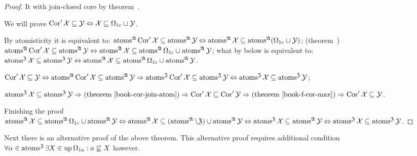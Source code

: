 \begin{proof}
It with join-closed core by theorem~.

We will prove $\operatorname{Cor}'\mathcal{X} \sqsubseteq \mathcal{Y} \Leftrightarrow
\mathcal{X} \sqsubseteq \Omega_{1c} \sqcup \mathcal{Y}$.

By atomisticity it is equivalent to:
$\operatorname{atoms}^{\mathfrak{A}}\operatorname{Cor}'\mathcal{X} \subseteq \operatorname{atoms}^{\mathfrak{A}}\mathcal{Y}
\Leftrightarrow
\operatorname{atoms}^{\mathfrak{A}}\mathcal{X} \subseteq \operatorname{atoms}^{\mathfrak{A}}(\Omega_{1c} \sqcup \mathcal{Y})$;
(theorem~)
$\operatorname{atoms}^{\mathfrak{A}}\operatorname{Cor}'\mathcal{X} \subseteq \operatorname{atoms}^{\mathfrak{A}}\mathcal{Y}
\Leftrightarrow
\operatorname{atoms}^{\mathfrak{A}}\mathcal{X} \subseteq \operatorname{atoms}^{\mathfrak{A}}\Omega_{1c} \cup \operatorname{atoms}^{\mathfrak{A}}\mathcal{Y}$;
what by below is equivalent to:
$\operatorname{atoms}^{\mathfrak{Z}}  \mathcal{X} \subseteq
\operatorname{atoms}^{\mathfrak{Z}}  \mathcal{Y} \Leftrightarrow
\operatorname{atoms}^{\mathfrak{A}}  \mathcal{X} \subseteq \operatorname{atoms}^{\mathfrak{A}}
\Omega_{1c} \cup \operatorname{atoms}^{\mathfrak{A}}  \mathcal{Y}$.

$\operatorname{Cor}' \mathcal{X} \sqsubseteq \mathcal{Y} \Leftrightarrow
\operatorname{atoms}^{\mathfrak{A}} \operatorname{Cor}' \mathcal{X} \subseteq
\operatorname{atoms}^{\mathfrak{A}}  \mathcal{Y} \Rightarrow
\operatorname{atoms}^{\mathfrak{Z}} \operatorname{Cor}' \mathcal{X} \subseteq
\operatorname{atoms}^{\mathfrak{Z}}  \mathcal{Y} \Leftrightarrow
\operatorname{atoms}^{\mathfrak{Z}}  \mathcal{X} \subseteq \operatorname{atoms}^{\mathfrak{Z}}
\mathcal{Y}$;

$\atoms^{\mathfrak{Z}}  \mathcal{X} \subseteq
\atoms^{\mathfrak{Z}}  \mathcal{Y} \Rightarrow
\text{(theorem~\bookref{cor-join-atom})} \Rightarrow
\Cor' \mathcal{X}
\sqsubseteq \Cor' \mathcal{Y} \Rightarrow
\text{(theorem~\bookref{f-cor-max})} \Rightarrow
\Cor' \mathcal{X} \sqsubseteq \mathcal{Y}$.

Finishing the proof
$\operatorname{atoms}^{\mathfrak{A}} \mathcal{X} \subseteq \operatorname{atoms}^{\mathfrak{A}}
\Omega_{1c} \cup \operatorname{atoms}^{\mathfrak{A}} \mathcal{Y} \Leftrightarrow
\operatorname{atoms}^{\mathfrak{A}} \mathcal{X} \subseteq
(\operatorname{atoms}^{\mathfrak{A}} \setminus \mathfrak{Z})
\cup \operatorname{atoms}^{\mathfrak{A}} \mathcal{Y} \Leftrightarrow
\operatorname{atoms}^{\mathfrak{Z}} \mathcal{X} \subseteq
\operatorname{atoms}^{\mathfrak{A}} \mathcal{Y} \Leftrightarrow
\operatorname{atoms}^{\mathfrak{Z}} \mathcal{X} \subseteq
\operatorname{atoms}^{\mathfrak{Z}} \mathcal{Y}$.
\end{proof}

Next there is an alternative proof of the above theorem.
This alternative proof requires additional condition
$\forall \alpha \in \operatorname{atoms}^{\mathfrak{Z}} \exists X \in \operatorname{up} \Omega_{1a} : a
\not\sqsubseteq X$ however.

